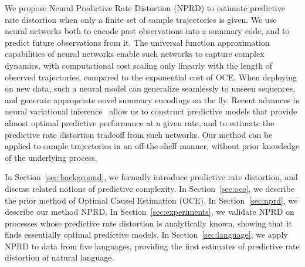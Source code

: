 \documentclass[11pt,letterpaper]{article}
\begin{document}
We propose Neural Predictive Rate Distortion (NPRD) to estimate predictive rate distortion when only a finite set of sample trajectories is given.
We use neural networks both to encode past observations into a summary code, and to predict future observations from it.
The universal function approximation capabilities of neural networks enable such networks to capture complex dynamics, with computational cost scaling only linearly with the length of observed trajectories, compared to the exponential cost of OCE.
When deploying on new data, such a neural model can generalize seamlessly to unseen sequences, and generate appropriate novel summary encodings on the fly.
Recent advances in neural variational inference~\citep{rezende-variational-2015,huang-neural-2018} allow us to construct predictive models that provide almost optimal predictive performance at a given rate, and to estimate the predictive rate distortion tradeoff from such networks.
Our method can be applied to sample trajectories in an off-the-shelf manner, without prior knowledge of the underlying process.

In Section~\ref{sec:background}, we formally introduce predictive rate distortion, and discuss related notions of predictive complexity.
In Section~\ref{sec:oce}, we describe the prior method of Optimal Causel Estimation (OCE).
In Section~\ref{sec:nprd}, we describe our method NPRD.
In Section~\ref{sec:experiments}, we validate NPRD on processes whose predictive rate distortion is analytically known, showing that it finds essentially optimal predictive models.
In Section~\ref{sec:language}, we apply NPRD to data from five languages, providing the first estimates of predictive rate distortion of natural language.


\end{document}
